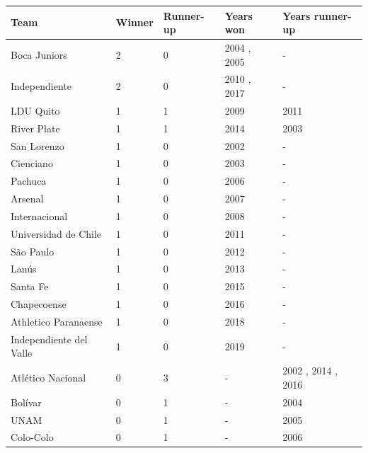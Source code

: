 \documentclass{article}
\begin{document}
\begin{tabular}{lllll}
\toprule
Team & Winner & Runner-up & Years won & Years runner-up \\
\midrule
Boca Juniors & 2 & 0 & 2004 , 2005 & - \\
Independiente & 2 & 0 & 2010 , 2017 & - \\
LDU Quito & 1 & 1 & 2009 & 2011 \\
River Plate & 1 & 1 & 2014 & 2003 \\
San Lorenzo & 1 & 0 & 2002 & - \\
Cienciano & 1 & 0 & 2003 & - \\
Pachuca & 1 & 0 & 2006 & - \\
Arsenal & 1 & 0 & 2007 & - \\
Internacional & 1 & 0 & 2008 & - \\
Universidad de Chile & 1 & 0 & 2011 & - \\
São Paulo & 1 & 0 & 2012 & - \\
Lanús & 1 & 0 & 2013 & - \\
Santa Fe & 1 & 0 & 2015 & - \\
Chapecoense & 1 & 0 & 2016 & - \\
Athletico Paranaense & 1 & 0 & 2018 & - \\
Independiente del Valle & 1 & 0 & 2019 & - \\
Atlético Nacional & 0 & 3 & - & 2002 , 2014 , 2016 \\
Bolívar & 0 & 1 & - & 2004 \\
UNAM & 0 & 1 & - & 2005 \\
Colo-Colo & 0 & 1 & - & 2006 \\
\bottomrule
\end{tabular}
\end{document}
